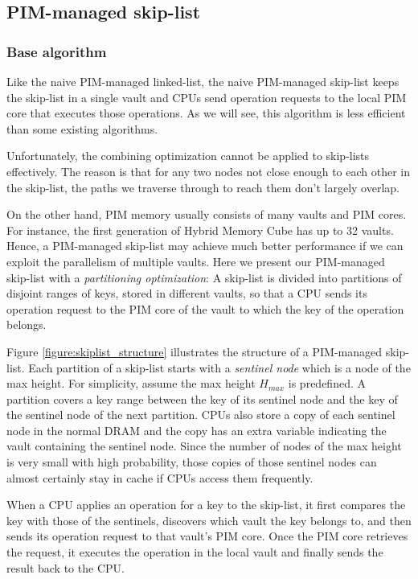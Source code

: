 \subsection{PIM-managed skip-list}
\label{section:skip_list}

\subsubsection{Base algorithm}
Like the naive PIM-managed linked-list,
the naive PIM-managed skip-list keeps the skip-list in a single vault and
CPUs send operation requests to the local PIM core that executes those operations.
As we will see, this algorithm is less efficient than some existing algorithms.

Unfortunately, the combining optimization cannot be applied to skip-lists effectively.
The reason is that for any two nodes not close enough to each other in the skip-list,
the paths we traverse through to reach them don't largely overlap.

On the other hand, PIM memory usually consists of many vaults and PIM cores.
For instance, the first generation of Hybrid Memory Cube \cite{website:HMC} has up to 32 vaults.
Hence, a PIM-managed skip-list may achieve much better performance if
we can exploit the parallelism of multiple vaults.
Here we present our PIM-managed skip-list with a \textit{partitioning optimization}:
A skip-list is divided into partitions of disjoint ranges of keys,
stored in different vaults, so that a CPU sends its operation request to
the PIM core of the vault to which the key of the operation belongs.

Figure \ref{figure:skiplist_structure} illustrates the structure of a PIM-managed skip-list.
Each partition of a skip-list starts with a \textit{sentinel node}
which is a node of the max height. 
For simplicity, assume the max height $H_{max}$ is predefined.
A partition covers a key range between the key of its sentinel node and
the key of the sentinel node of the next partition.
CPUs also store a copy of each sentinel node in the normal DRAM and 
the copy has an extra variable indicating the vault containing the sentinel node.
Since the number of nodes of the max height is very small with high probability, 
those copies of those sentinel nodes can almost certainly stay in cache
if CPUs access them frequently.

When a CPU applies an operation for a key to the skip-list,
it first compares the key with those of the sentinels, discovers which vault
the key belongs to, and then sends its operation request to that vault's PIM core.
Once the PIM core retrieves the request, it executes the operation in the local vault 
and finally sends the result back to the CPU.


